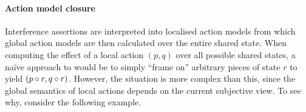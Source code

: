 \paragraph{Action model closure}
\label{subsec:amodClosure}

Interference assertions are interpreted into localised action models
from which global action models are then calculated over the entire
shared state. When computing the effect of a local action $(p,q)$ over
all possible shared states, a naïve approach to would be to simply
``frame on'' arbitrary pieces of state $r$ to yield $(p\circ r,
q\circ r)$.  However, the situation is more complex than this,
since the global semantics of local actions depends on the current
subjective view. To see why, consider the following example.

